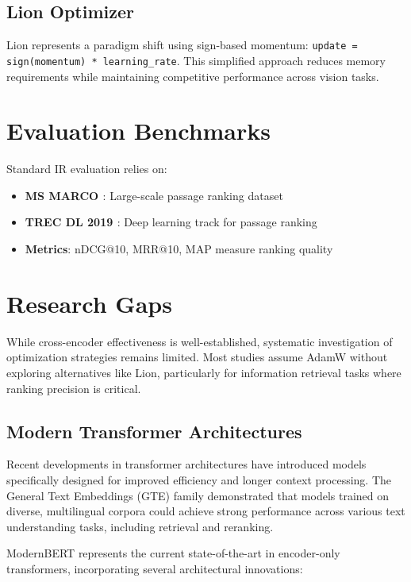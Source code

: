 \subsection{Lion Optimizer}
Lion \cite{chen2023symbolic} represents a paradigm shift using sign-based momentum: \texttt{update = sign(momentum) * learning\_rate}. This simplified approach reduces memory requirements while maintaining competitive performance across vision tasks.

\section{Evaluation Benchmarks}

Standard IR evaluation relies on:
\begin{itemize}
\item \textbf{MS MARCO \cite{DBLP:journals/corr/NguyenRSGTMD16}}: Large-scale passage ranking dataset
\item \textbf{TREC DL 2019 \cite{craswell2020overview}}: Deep learning track for passage ranking
\item \textbf{Metrics}: nDCG@10, MRR@10, MAP measure ranking quality
\end{itemize}

\section{Research Gaps}

While cross-encoder effectiveness is well-established, systematic investigation of optimization strategies remains limited. Most studies assume AdamW without exploring alternatives like Lion, particularly for information retrieval tasks where ranking precision is critical.

\subsection{Modern Transformer Architectures}

Recent developments in transformer architectures have introduced models specifically designed for improved efficiency and longer context processing. The General Text Embeddings (GTE) family \cite{li2023towards} demonstrated that models trained on diverse, multilingual corpora could achieve strong performance across various text understanding tasks, including retrieval and reranking.

ModernBERT \cite{modernbert} represents the current state-of-the-art in encoder-only transformers, incorporating several architectural innovations:

